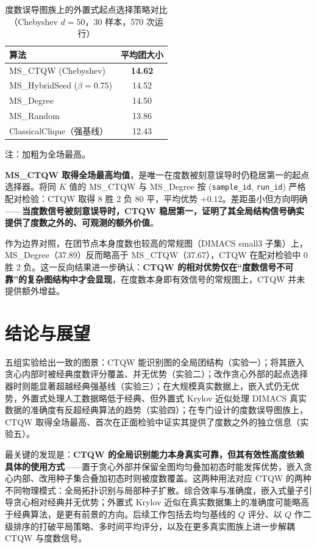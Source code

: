 \documentclass[pre,twocolumn]{revtex4-2}
\begin{document}
\begin{table}[H]
\caption{度数误导图族上的外置式起点选择策略对比（Chebyshev $d=50$，30 样本，570 次运行）}
\label{tbl:misleading}
\centering
\begin{tabular}{lc}
\hline\hline
算法 & 平均团大小 \\
\hline
MS\_CTQW (Chebyshev) & \textbf{14.62} \\
MS\_HybridSeed ($\beta=0.75$) & 14.52 \\
MS\_Degree & 14.50 \\
MS\_Random & 13.86 \\
ClassicalClique（强基线） & 12.43 \\
\hline\hline
\end{tabular}
\par\vspace{2pt}
{\footnotesize 注：加粗为全场最高。}
\end{table}

\textbf{MS\_CTQW 取得全场最高均值}，是唯一在度数被刻意误导时仍稳居第一的起点选择器。将同 $K$ 值的 MS\_CTQW 与 MS\_Degree 按 (\texttt{sample\_id}, \texttt{run\_id}) 严格配对检验：CTQW 取得 8 胜 2 负 80 平，平均优势 $+0.12$。差距虽小但方向明确——\textbf{当度数信号被刻意误导时，CTQW 稳居第一，证明了其全局结构信号确实提供了度数之外的、可观测的额外价值}。

作为边界对照，在团节点本身度数也较高的常规图（DIMACS small3 子集）上，MS\_Degree（37.89）反而略高于 MS\_CTQW（37.67），CTQW 在配对检验中 0 胜 2 负。这一反向结果进一步确认：\textbf{CTQW 的相对优势仅在``度数信号不可靠''的复杂图结构中才会显现}，在度数本身即有效信号的常规图上，CTQW 并未提供额外增益。

\section{结论与展望}

五组实验给出一致的图景：CTQW 能识别图的全局团结构（实验一）；将其嵌入贪心内部时被经典度数评分覆盖、并无优势（实验二）；改作贪心外部的起点选择器时则能显著超越经典强基线（实验三）；在大规模真实数据上，嵌入式仍无优势，外置式处理人工数据略低于经典、但外置式 Krylov 近似处理 DIMACS 真实数据的准确度有反超经典算法的趋势（实验四）；在专门设计的度数误导图族上，CTQW 取得全场最高、首次在正面检验中证实其提供了度数之外的独立信息（实验五）。

最关键的发现是：\textbf{CTQW 的全局识别能力本身真实可靠，但其有效性高度依赖具体的使用方式}——置于贪心外部并保留全图均匀叠加初态时能发挥优势，嵌入贪心内部、改用种子集合叠加初态时则被度数覆盖。这两种用法对应 CTQW 的两种不同物理模式：全局拓扑识别与局部种子扩散。综合效率与准确度，嵌入式量子引导贪心相对经典并无优势；外置式 Krylov 近似在真实数据集上的准确度可能略高于经典算法，是更有前景的方向。后续工作包括去均匀基线的 $Q$ 评分、以 $Q$ 作二级排序的打破平局策略、多时间平均评分，以及在更多真实图族上进一步解耦 CTQW 与度数信号。
\end{document}
